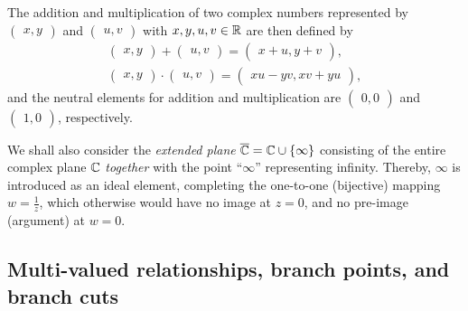 The addition and multiplication of two complex numbers represented by $\begin{pmatrix}x,y\end{pmatrix}$ and $\begin{pmatrix}u,v\end{pmatrix}$ with $x,y,u,v \in {\Bbb R}$
are then defined by
\begin{equation}
\begin{split}
\begin{pmatrix}x,y\end{pmatrix} + \begin{pmatrix}u,v\end{pmatrix} = \begin{pmatrix}x+u,y+v\end{pmatrix},\\
\begin{pmatrix}x,y\end{pmatrix} \cdot \begin{pmatrix}u,v\end{pmatrix} = \begin{pmatrix}xu-yv,xv+yu\end{pmatrix},
\end{split}
\end{equation}
and the neutral elements for addition and multiplication are $\begin{pmatrix}0,0\end{pmatrix}$ and $\begin{pmatrix}1,0\end{pmatrix}$, respectively.


We shall also consider the {\em extended plane}  ${\overline{\Bbb C}} = {\Bbb C} \cup \{\infty \}$
consisting of the entire complex plane ${\Bbb C}$ {\em together} with the point ``$\infty$''
representing infinity.
Thereby, $\infty$
is introduced as an ideal element,
completing the one-to-one (bijective) mapping $w=\frac{1}{z}$,
which otherwise would have no image at $z=0$, and no pre-image (argument)
at $w=0$.


\subsection{Multi-valued relationships, branch points, and branch cuts}


